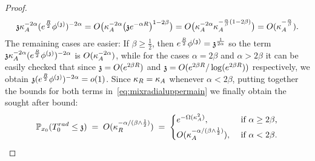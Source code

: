 \begin{proof}
\[
\ss\KA^{-2\alpha}(e^{\frac{R}{2}}\phis)^{-2\alpha}=O\big(\KA^{-2\alpha}\big(\ss e^{-\alpha R}\big)^{1-2\beta}\big)=O\big(\KA^{-2\alpha}\KA^{-\frac{\alpha}{\beta}(1-2\beta)}\big)=O(\KA^{-\frac{\alpha}{\beta}}).\]
The remaining cases are easier: If $\beta\geq\frac{1}{2}$, then $e^{\frac{R}{2}}\phis=\ss^{\frac{1}{2\alpha}}$ so the term $\ss\KA^{-2\alpha}(e^{\frac{R}{2}}\phis)^{-2\alpha}$ is $O(\KA^{-2\alpha})$, while for the cases $\alpha=2\beta$ and $\alpha>2\beta$ it can be easily checked that since $\ss= O(e^{2\beta R})$ and $\ss= O(e^{2\beta R}/\log(e^{2\beta R}))$ respectively, we obtain $\ss(e^{\frac{R}{2}}\phis)^{-2\alpha}=o(1)$. Since $\KR=\KA$ whenever $\alpha<2\beta$, putting together the bounds for both terms in~\eqref{eq:mixradialuppermain} we finally obtain the sought after bound:
\[\PP_{x_0}(\trad\leq \ss)\;=\;O(\KR^{-\alpha/(\beta\wedge\frac12)})\;=\;\begin{cases}
e^{-\Omega(\KA^2)},
& \text{ if $\alpha\geq2\beta$,} \\[2pt]
O(\KA^{-\alpha/(\beta\wedge\frac12)}),
& \text{ if $\alpha<2\beta$.}
\end{cases}\]


\end{proof}
